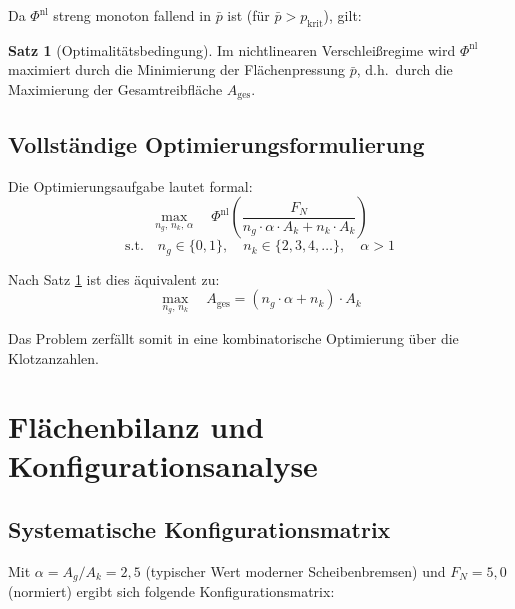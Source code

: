 ﻿\documentclass[12pt,a4paper]{article}
\theoremstyle{definition}
\newtheorem{satz}{Satz}[section]
\begin{document}
Da $\Phi^{\text{nl}}$ streng monoton fallend in $\bar{p}$ ist
(für $\bar{p} > p_{\text{krit}}$), gilt:

\begin{satz}[Optimalitätsbedingung]
  Im nichtlinearen Verschleißregime wird $\Phi^{\text{nl}}$ maximiert
  durch die Minimierung der Flächenpressung $\bar{p}$, d.h.\ durch die
  Maximierung der Gesamtreibfläche $A_{\text{ges}}$.
  \label{satz:optimum}
\end{satz}

\subsection{Vollständige Optimierungsformulierung}

Die Optimierungsaufgabe lautet formal:
\begin{equation}
  \max_{n_g,\,n_k,\,\alpha} \quad
  \Phi^{\text{nl}}\!\left(\frac{F_N}{n_g \cdot \alpha \cdot A_k + n_k \cdot A_k}\right)
  \label{eq:opt_problem}
\end{equation}
\begin{equation*}
  \text{s.t.} \quad n_g \in \{0, 1\}, \quad n_k \in \{2, 3, 4, \ldots\}, \quad \alpha > 1
\end{equation*}

Nach Satz \ref{satz:optimum} ist dies äquivalent zu:
\begin{equation}
  \max_{n_g,\,n_k} \quad A_{\text{ges}} = (n_g \cdot \alpha + n_k) \cdot A_k
  \label{eq:opt_aequivalent}
\end{equation}

Das Problem zerfällt somit in eine kombinatorische Optimierung über die
Klotzanzahlen.

\section{Flächenbilanz und Konfigurationsanalyse}

\subsection{Systematische Konfigurationsmatrix}

Mit $\alpha = A_g / A_k = 2{,}5$ (typischer Wert moderner Scheibenbremsen)
und $F_N = 5{,}0$ (normiert) ergibt sich folgende Konfigurationsmatrix:
\end{document}
